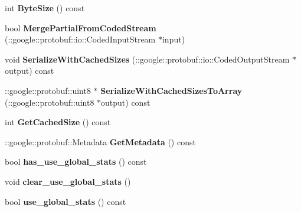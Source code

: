 \begin{DoxyCompactItemize}
int {\bfseries Byte\+Size} () const
\item 
\mbox{\label{classcaffe_1_1_batch_norm_parameter_a07f7dd4c212b19d99954515621f01082}} 
bool {\bfseries Merge\+Partial\+From\+Coded\+Stream} (\+::google\+::protobuf\+::io\+::\+Coded\+Input\+Stream $\ast$input)
\item 
\mbox{\label{classcaffe_1_1_batch_norm_parameter_ad6d1ebec1fb50acafb1860793cbc9f0c}} 
void {\bfseries Serialize\+With\+Cached\+Sizes} (\+::google\+::protobuf\+::io\+::\+Coded\+Output\+Stream $\ast$output) const
\item 
\mbox{\label{classcaffe_1_1_batch_norm_parameter_a4f54340600f82d022197e64c9889255e}} 
\+::google\+::protobuf\+::uint8 $\ast$ {\bfseries Serialize\+With\+Cached\+Sizes\+To\+Array} (\+::google\+::protobuf\+::uint8 $\ast$output) const
\item 
\mbox{\label{classcaffe_1_1_batch_norm_parameter_a76aeb912a1e33e15869660bb76fedefb}} 
int {\bfseries Get\+Cached\+Size} () const
\item 
\mbox{\label{classcaffe_1_1_batch_norm_parameter_a4ba7c78ff79c570a9f6ef40eae2fe6f7}} 
\+::google\+::protobuf\+::\+Metadata {\bfseries Get\+Metadata} () const
\item 
\mbox{\label{classcaffe_1_1_batch_norm_parameter_a4f9c27934a988c30718f3d03a95d2178}} 
bool {\bfseries has\+\_\+use\+\_\+global\+\_\+stats} () const
\item 
\mbox{\label{classcaffe_1_1_batch_norm_parameter_a2b810cf45bdb5c28a077cc94c9becbdd}} 
void {\bfseries clear\+\_\+use\+\_\+global\+\_\+stats} ()
\item 
\mbox{\label{classcaffe_1_1_batch_norm_parameter_a314c449e97b53a2e492c3c359407e189}} 
bool {\bfseries use\+\_\+global\+\_\+stats} () const
\item 
\mbox{\label{classcaffe_1_1_batch_norm_parameter_aa599ca8b981624638d44d34cbc9d29a8}} 

\end{DoxyCompactItemize}
